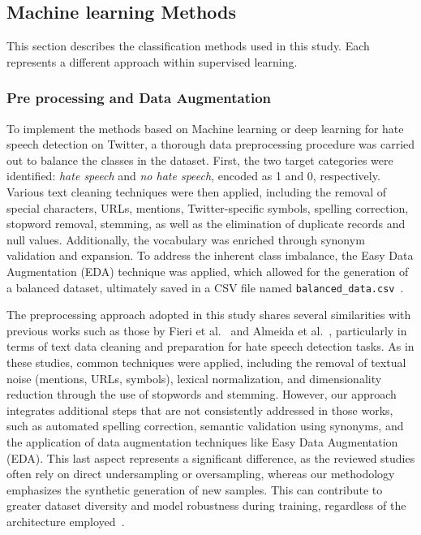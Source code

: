 \subsection{Machine learning Methods}
This section describes the classification methods used in this study. Each represents a different approach within supervised learning.

\subsubsection{Pre processing and Data Augmentation}
\label{sec:preprocessing}
To implement the methods based on Machine learning or deep learning for hate speech detection on Twitter, a thorough data preprocessing procedure was carried out to balance the classes in the dataset. First, the two target categories were identified: \textit{hate speech} and \textit{no hate speech}, encoded as 1 and 0, respectively. Various text cleaning techniques were then applied, including the removal of special characters, URLs, mentions, Twitter-specific symbols, spelling correction, stopword removal, stemming, as well as the elimination of duplicate records and null values. Additionally, the vocabulary was enriched through synonym validation and expansion. To address the inherent class imbalance, the Easy Data Augmentation (EDA) technique was applied, which allowed for the generation of a balanced dataset, ultimately saved in a CSV file named \texttt{balanced\_data.csv}~\cite{wei2019eda}.

The preprocessing approach adopted in this study shares several similarities with previous works such as those by Fieri et al.~\cite{fieri2023offensive} and Almeida et al.~\cite{almeida2023comparison}, particularly in terms of text data cleaning and preparation for hate speech detection tasks. As in these studies, common techniques were applied, including the removal of textual noise (mentions, URLs, symbols), lexical normalization, and dimensionality reduction through the use of stopwords and stemming. However, our approach integrates additional steps that are not consistently addressed in those works, such as automated spelling correction, semantic validation using synonyms, and the application of data augmentation techniques like Easy Data Augmentation (EDA). This last aspect represents a significant difference, as the reviewed studies often rely on direct undersampling or oversampling, whereas our methodology emphasizes the synthetic generation of new samples. This can contribute to greater dataset diversity and model robustness during training, regardless of the architecture employed~\cite{wei2019eda}.


